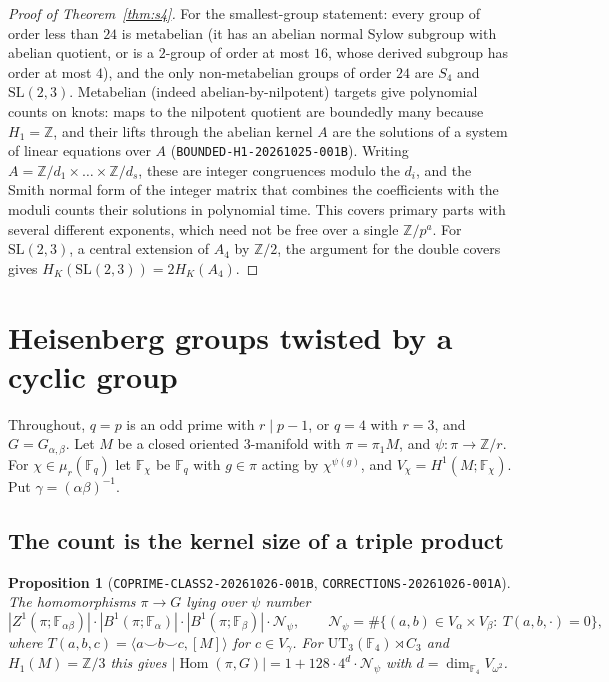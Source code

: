 \documentclass[11pt]{article}
\newtheorem{proposition}[theorem]{Proposition}
\theoremstyle{definition}
\theoremstyle{remark}
\newcommand{\F}{\mathbb{F}}
\newcommand{\Z}{\mathbb{Z}}
\newcommand{\Hom}{\operatorname{Hom}}
\newcommand{\cN}{\mathcal{N}}
\begin{document}
\begin{proof}[Proof of Theorem~\ref{thm:s4}]
For the smallest-group statement: every group of order less than $24$ is
metabelian (it has an abelian normal Sylow subgroup with abelian quotient, or is
a $2$-group of order at most $16$, whose derived subgroup has order at most
$4$), and the only non-metabelian groups of order $24$ are $S_4$ and
$\mathrm{SL}(2,3)$. Metabelian (indeed abelian-by-nilpotent) targets give
polynomial counts on knots: maps to the nilpotent quotient are boundedly many
because $H_1=\Z$, and their lifts through the abelian kernel $A$ are the
solutions of a system of linear equations over $A$
(\texttt{BOUNDED-H1-20261025-001B}). Writing
$A=\Z/d_1\times\dots\times\Z/d_s$, these are integer congruences modulo the
$d_i$, and the Smith normal form of the integer matrix that combines the
coefficients with the moduli counts their solutions in polynomial time. This
covers primary parts with several different exponents, which need not be free
over a single $\Z/p^a$. For $\mathrm{SL}(2,3)$, a central
extension of $A_4$ by $\Z/2$, the argument for the double covers gives
$H_K(\mathrm{SL}(2,3))=2H_K(A_4)$.
\end{proof}

\section{Heisenberg groups twisted by a cyclic group}\label{sec:heis}

Throughout, $q=p$ is an odd prime with $r\mid p-1$, or $q=4$ with $r=3$, and
$G=G_{\alpha,\beta}$. Let $M$ be a closed oriented 3-manifold with
$\pi=\pi_1M$, and $\psi\colon\pi\to\Z/r$. For $\chi\in\mu_r(\F_q)$ let
$\F_\chi$ be $\F_q$ with $g\in\pi$ acting by $\chi^{\psi(g)}$, and
$V_\chi=H^1(M;\F_\chi)$. Put $\gamma=(\alpha\beta)^{-1}$.

\subsection{The count is the kernel size of a triple product}

\begin{proposition}[\texttt{COPRIME-CLASS2-20261026-001B}, \texttt{CORRECTIONS-20261026-001A}]\label{prop:count}
The homomorphisms $\pi\to G$ lying over $\psi$ number
\[
|Z^1(\pi;\F_{\alpha\beta})|\cdot|B^1(\pi;\F_\alpha)|\cdot|B^1(\pi;\F_\beta)|\cdot\cN_\psi,
\qquad \cN_\psi=\#\{(a,b)\in V_\alpha\times V_\beta:\ T(a,b,\cdot)=0\},
\]
where $T(a,b,c)=\langle a\smile b\smile c,[M]\rangle$ for $c\in V_\gamma$. For
$\mathrm{UT}_3(\F_4)\rtimes C_3$ and $H_1(M)=\Z/3$ this gives
$|\Hom(\pi,G)|=1+128\cdot4^d\cdot\cN_\psi$ with $d=\dim_{\F_4}V_{\omega^2}$.
\end{proposition}
\end{document}
